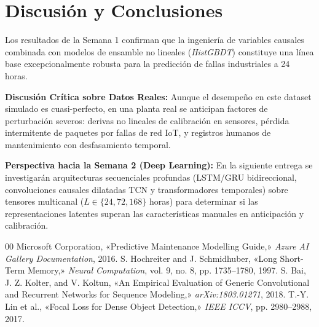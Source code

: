 \documentclass[conference]{IEEEtran}
\begin{document}
\section{Discusión y Conclusiones}
Los resultados de la Semana 1 confirman que la ingeniería de variables causales combinada con modelos de ensamble no lineales (\textit{HistGBDT}) constituye una línea base excepcionalmente robusta para la predicción de fallas industriales a 24 horas.

\textbf{Discusión Crítica sobre Datos Reales:} Aunque el desempeño en este dataset simulado es cuasi-perfecto, en una planta real se anticipan factores de perturbación severos: derivas no lineales de calibración en sensores, pérdida intermitente de paquetes por fallas de red IoT, y registros humanos de mantenimiento con desfasamiento temporal.

\textbf{Perspectiva hacia la Semana 2 (Deep Learning):} En la siguiente entrega se investigarán arquitecturas secuenciales profundas (LSTM/GRU bidireccional, convoluciones causales dilatadas TCN y transformadores temporales) sobre tensores multicanal ($L \in \{24, 72, 168\}$ horas) para determinar si las representaciones latentes superan las características manuales en anticipación y calibración.

\begin{thebibliography}{00}
 Microsoft Corporation, «Predictive Maintenance Modelling Guide,» \textit{Azure AI Gallery Documentation}, 2016.
 S. Hochreiter and J. Schmidhuber, «Long Short-Term Memory,» \textit{Neural Computation}, vol. 9, no. 8, pp. 1735--1780, 1997.
 S. Bai, J. Z. Kolter, and V. Koltun, «An Empirical Evaluation of Generic Convolutional and Recurrent Networks for Sequence Modeling,» \textit{arXiv:1803.01271}, 2018.
 T.-Y. Lin et al., «Focal Loss for Dense Object Detection,» \textit{IEEE ICCV}, pp. 2980--2988, 2017.
\end{thebibliography}
\end{document}
